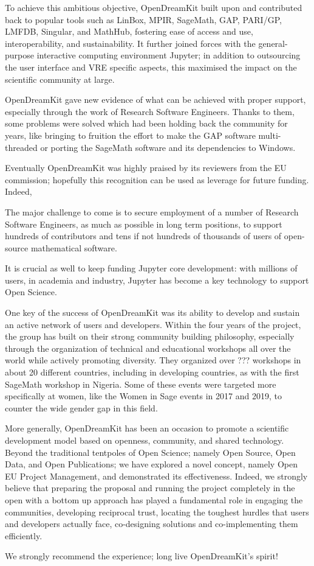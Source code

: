 To achieve this ambitious objective, OpenDreamKit built upon and contributed back to popular tools such as LinBox, MPIR, 
SageMath, GAP, PARI/GP, LMFDB, Singular, and MathHub, fostering ease of access and use, interoperability, and sustainability. 
It further joined forces with the general-purpose interactive computing environment Jupyter; in addition to outsourcing the 
user interface and VRE specific aspects, this maximised the impact on the scientific community at large.

OpenDreamKit gave new evidence of what can be achieved with proper support, especially through the work of Research 
Software Engineers. Thanks to them, some problems were solved which had been holding back the community for years, 
like bringing to fruition the effort to make the GAP software multi-threaded or porting the SageMath software and 
its dependencies to Windows.

Eventually OpenDreamKit was highly praised by its reviewers from the EU commission; hopefully this recognition 
can be used as leverage for future funding. Indeed, 

The major challenge to come is to secure employment of a number of Research Software Engineers, as much as possible
 in long term positions, to support hundreds of contributors and tens if not hundreds of thousands of users of open-source 
mathematical software.

It is crucial as well to keep funding Jupyter core development: with millions of users, in academia and industry,
 Jupyter has become a key technology to support Open Science.

One key of the success of OpenDreamKit was its ability to develop and sustain an active network of users and developers. 
Within the four years of the project, the group has built on their strong community building philosophy, especially through 
the organization of technical and educational workshops all over the world while actively promoting diversity. They organized
 over ??? workshops in about 20 different countries, including in developing countries, as with the first SageMath workshop 
in Nigeria. Some of these events were targeted more specifically at women, like the Women in Sage events in 2017 and 2019,
 to counter the wide gender gap in this field.

More generally, OpenDreamKit has been an occasion to promote a scientific development model based on openness, community,
 and shared technology. Beyond the traditional tentpoles of Open Science; namely Open Source, Open Data, and Open Publications;
 we have explored a novel concept, namely Open EU Project Management, and demonstrated its effectiveness. Indeed, we strongly
 believe that preparing the proposal and running the project completely in the open with a bottom up approach has played a 
fundamental role in engaging the communities, developing reciprocal trust, locating the toughest hurdles that users and 
developers actually face, co-designing solutions and co-implementing them efficiently.

We strongly recommend the experience; long live OpenDreamKit’s spirit!
